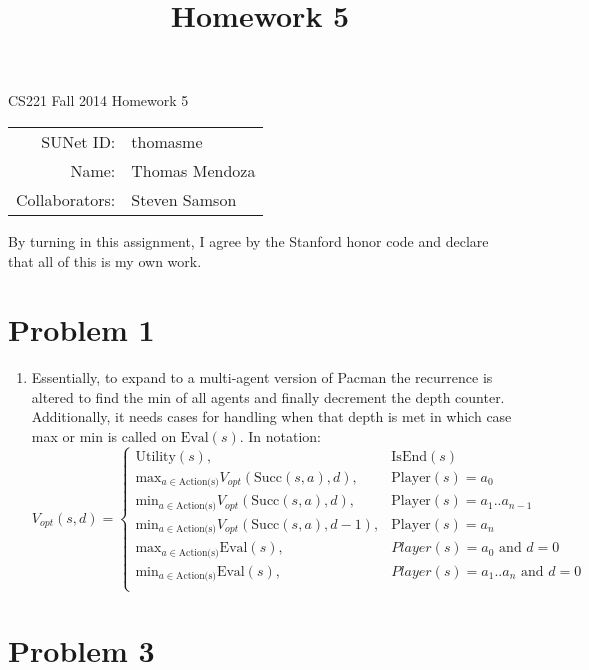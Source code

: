 \documentclass[12pt]{article}
\title{Homework 5}
\begin{document}
\begin{center}
{\Large CS221 Fall 2014 Homework 5}

\begin{tabular}{rl}
SUNet ID: & thomasme \\
Name: & Thomas Mendoza \\
Collaborators: & Steven Samson
\end{tabular}
\end{center}

By turning in this assignment, I agree by the Stanford honor code and declare
that all of this is my own work.

\section*{Problem 1}

\begin{enumerate}[label=(\alph*)]
	\item Essentially, to expand to a multi-agent version of Pacman the
		recurrence is altered to find the min of all agents and finally
		decrement the depth counter. Additionally, it needs cases for handling
		when that depth is met in which case max or min is called on
		\(\text{Eval}(s)\). In notation:
		\[
			V_{opt}(s,d) = 
			\begin{cases}
				\text{Utility}(s), & \text{IsEnd}(s)\\
				\text{max}_{a \in \text{Action(s)}} V_{opt}(\text{Succ}(s,a), d), &
					\text{Player}(s) = a_0\\
				\text{min}_{a \in \text{Action(s)}} V_{opt}(\text{Succ}(s,a), d), &
					\text{Player}(s) = a_1..a_{n-1}\\
				\text{min}_{a \in \text{Action(s)}} V_{opt}(\text{Succ}(s,a), d-1), &
					\text{Player}(s) = a_n\\
				\text{max}_{a \in \text{Action(s)}} \text{Eval}(s), &
					Player(s) = a_0 \text{ and } d = 0\\
				\text{min}_{a \in \text{Action(s)}} \text{Eval}(s), &
					Player(s) = a_1..a_n \text{ and } d = 0\\
			\end{cases}
		\]
\end{enumerate}

\section*{Problem 3}
\end{document}
